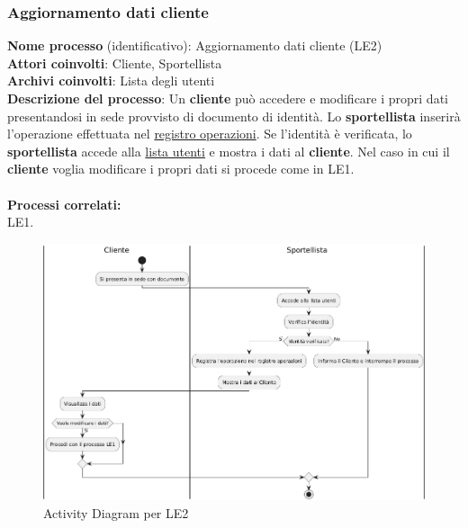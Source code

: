 \documentclass[a4paper,12pt]{article}
\begin{document}
\subsubsection{Aggiornamento dati cliente}
\textbf{Nome processo} (identificativo): Aggiornamento dati cliente (LE2) \\
\textbf{Attori coinvolti}: Cliente, Sportellista \\
\textbf{Archivi coinvolti}: Lista degli utenti \\ 
\textbf{Descrizione del processo}:  Un \textbf{cliente} può accedere e modificare i propri dati presentandosi in sede provvisto di documento di identità.
Lo \textbf{sportellista} inserirà l'operazione effettuata nel \underline{registro operazioni}.
Se l'identità è verificata, lo \textbf{sportellista} accede alla \underline{lista utenti} e mostra i dati al \textbf{cliente}.
Nel caso in cui il \textbf{cliente} voglia modificare i propri dati si procede come in LE1.\\ \\
\textbf{Processi correlati:}\\LE1.\\
\begin{figure}[H]
  \centering
  \includegraphics[width=0.8\linewidth]{assets/activitydiagram_LE2.png}
	\caption{Activity Diagram per LE2}
\end{figure}

\newpage
\end{document}
